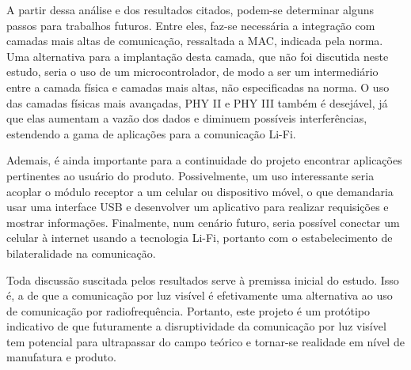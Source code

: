 	A partir dessa análise e dos resultados citados, podem-se determinar alguns passos para trabalhos futuros. Entre eles, faz-se necessária a integração com camadas mais altas de comunicação, ressaltada a MAC, indicada pela norma. Uma alternativa para a implantação desta camada, que não foi discutida neste estudo, seria o uso de um microcontrolador, de modo a ser um intermediário entre a camada física e camadas mais altas, não especificadas na norma. O uso das camadas físicas mais avançadas, PHY II e PHY III também é desejável, já que elas aumentam a vazão dos dados e diminuem possíveis interferências, estendendo a gama de aplicações para a comunicação Li-Fi.
	
	Ademais, é ainda importante para a continuidade do projeto encontrar aplicações pertinentes ao usuário do produto. Possivelmente, um uso interessante seria acoplar o módulo receptor a um celular ou dispositivo móvel, o que demandaria usar uma interface USB e desenvolver um aplicativo para realizar requisições e mostrar informações. Finalmente, num cenário futuro, seria possível conectar um celular à internet usando a tecnologia Li-Fi, portanto com o estabelecimento de bilateralidade na comunicação.
	
	Toda discussão suscitada pelos resultados serve à premissa inicial do estudo. Isso é, a de que a comunicação por luz visível é efetivamente uma alternativa ao uso de comunicação por radiofrequência. Portanto, este projeto é um protótipo indicativo de que futuramente a disruptividade da comunicação por luz visível tem potencial para ultrapassar do campo teórico e tornar-se realidade em nível de manufatura e produto. 